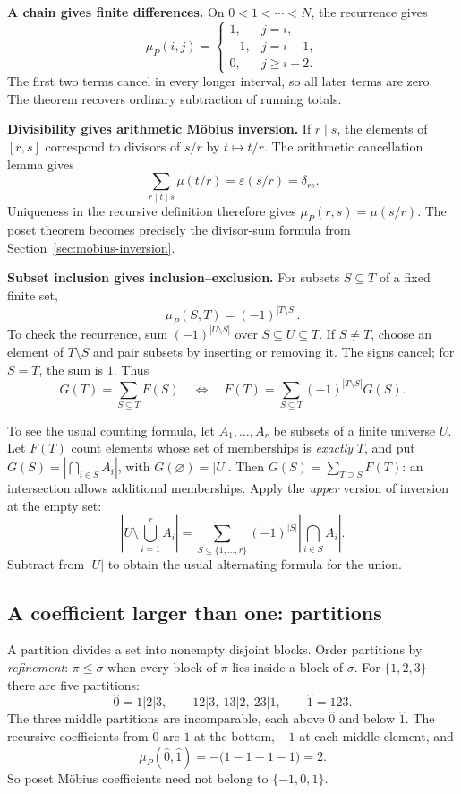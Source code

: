 \textbf{A chain gives finite differences.}
On $0<1<\cdots<N$, the recurrence gives
\[
 \mu_P(i,j)=
 \begin{cases}
 1,&j=i,\\
 -1,&j=i+1,\\
 0,&j\ge i+2.
 \end{cases}
\]
The first two terms cancel in every longer interval, so all later
terms are zero. The theorem recovers ordinary subtraction of running totals.

\textbf{Divisibility gives arithmetic M\"obius inversion.}
If $r\mid s$, the elements of $[r,s]$ correspond to divisors of $s/r$
by $t\mapsto t/r$. The arithmetic cancellation lemma gives
\[
 \sum_{r\mid t\mid s}\mu(t/r)=\varepsilon(s/r)=\delta_{rs}.
\]
Uniqueness in the recursive definition therefore gives
$\mu_P(r,s)=\mu(s/r)$. The poset theorem becomes precisely the
divisor-sum formula from Section~\ref{sec:mobius-inversion}.

\textbf{Subset inclusion gives inclusion--exclusion.}
For subsets $S\subseteq T$ of a fixed finite set,
\[
 \mu_P(S,T)=(-1)^{|T\setminus S|}.
\]
To check the recurrence, sum $(-1)^{|U\setminus S|}$ over
$S\subseteq U\subseteq T$. If $S\ne T$, choose an element of
$T\setminus S$ and pair subsets by inserting or removing it.
The signs cancel; for $S=T$, the sum is $1$.
Thus
\[
 G(T)=\sum_{S\subseteq T}F(S)
 \quad\Longleftrightarrow\quad
 F(T)=\sum_{S\subseteq T}(-1)^{|T\setminus S|}G(S).
\]

To see the usual counting formula, let $A_1,\ldots,A_r$ be subsets
of a finite universe $U$. Let $F(T)$ count elements whose set of
memberships is \emph{exactly} $T$, and put
$G(S)=|\bigcap_{i\in S}A_i|$, with $G(\varnothing)=|U|$.
Then $G(S)=\sum_{T\supseteq S}F(T)$: an intersection allows
additional memberships. Apply the \emph{upper} version of inversion
at the empty set:
\[
 \left|U\setminus\bigcup_{i=1}^r A_i\right|
 =\sum_{S\subseteq\{1,\ldots,r\}}(-1)^{|S|}
   \left|\bigcap_{i\in S}A_i\right|.
\]
Subtract from $|U|$ to obtain the usual alternating formula for the union.

\subsection{A coefficient larger than one: partitions}

A partition divides a set into nonempty disjoint blocks.
Order partitions by \emph{refinement}: $\pi\le\sigma$ when every
block of $\pi$ lies inside a block of $\sigma$.
For $\{1,2,3\}$ there are five partitions:
\[
 \widehat0=1|2|3,\qquad 12|3,\ 13|2,\ 23|1,\qquad
 \widehat1=123.
\]
The three middle partitions are incomparable, each above $\widehat0$
and below $\widehat1$. The recursive coefficients from $\widehat0$
are $1$ at the bottom, $-1$ at each middle element, and
\[
 \mu_P(\widehat0,\widehat1)=-\bigl(1-1-1-1\bigr)=2.
\]
So poset M\"obius coefficients need not belong to $\{-1,0,1\}$.

